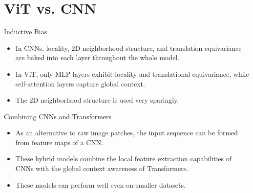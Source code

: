 \section{ViT vs. CNN}

\begin{frame}{Inductive Bias}
    \begin{itemize}
        \item In CNNs, locality, 2D neighborhood structure, and translation equivariance are baked into each layer throughout the whole model.
        \item In ViT, only MLP layers exhibit locality and translational equivariance, while self-attention layers capture global context.
        \item The 2D neighborhood structure is used very sparingly.
    \end{itemize}
\end{frame}

\begin{frame}{Combining CNNs and Transformers}
    \begin{itemize}
        \item As an alternative to raw image patches, the input sequence can be formed from feature maps of a CNN.
	    \item These hybrid models combine the local feature extraction capabilities of CNNs with the global context awareness of Transformers. 
        \item These models can perform well even on smaller datasets.
    \end{itemize}
\end{frame}

